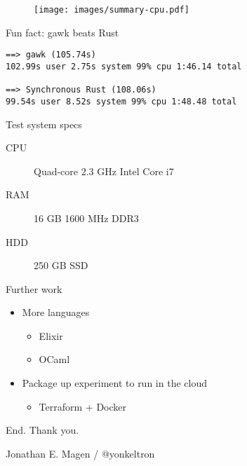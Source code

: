 \documentclass[aspectratio=169,14pt]{beamer}
\newcommand{\megatext}[1]{
  \begin{center}
    \Huge
    #1
  \end{center}
}
\begin{document}
\begin{frame}
  \begin{figure}
    \texttt{[image: images/summary-cpu.pdf]}
  \end{figure}
\end{frame}

\begin{frame}[fragile]{Fun fact: gawk beats Rust}
  \begin{verbatim}
==> gawk (105.74s)
102.99s user 2.75s system 99% cpu 1:46.14 total

==> Synchronous Rust (108.06s)
99.54s user 8.52s system 99% cpu 1:48.48 total
  \end{verbatim}
\end{frame}

\begin{frame}{Test system specs}
  \begin{description}
  \item[CPU] Quad-core 2.3 GHz Intel Core i7
  \item[RAM] 16 GB 1600 MHz DDR3
  \item[HDD] 250 GB SSD
  \end{description}
\end{frame}

\begin{frame}{Further work}
  \begin{itemize}
  \item More languages
    \begin{itemize}
    \item Elixir
    \item OCaml
    \end{itemize}
  \item Package up experiment to run in the cloud
    \begin{itemize}
    \item Terraform + Docker
    \end{itemize}
  \end{itemize}
\end{frame}

\begin{frame}
  \megatext{End. Thank you.}
  \Large
  \centering
  Jonathan E. Magen /  @yonkeltron
\end{frame}
\end{document}
